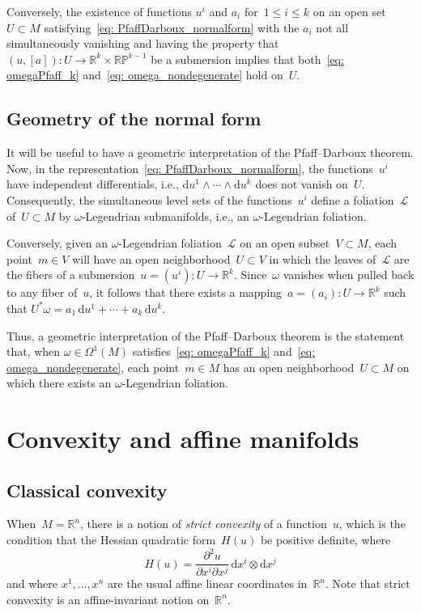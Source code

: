\documentclass[11pt]{article}
\numberwithin{equation}{section}
\renewcommand{\d}{\mathrm{d}}%
\newcommand{\cL}{{\mathcal L}}
\newcommand{\bbR}{{\mathbb R}}
\newcommand{\w}{\wedge}
\numberwithin{equation}{section}
\begin{document}
Conversely, the existence of functions $u^i$ and $a_i$ for~$1\le i\le k$
on an open set~$U\subset M$ satisfying~\eqref{eq: PfaffDarboux_normalform}
with the $a_i$ not all simultaneously vanishing and having the
property that $(u,[a]) \colon U\to\bbR^k\times\mathbb{RP}^{k-1}$
be a submersion implies that both~\eqref{eq: omegaPfaff_k}
and~\eqref{eq: omega_nondegenerate} hold on~$U$.

\subsection{Geometry of the normal form}
It will be useful to have a geometric interpretation
of the Pfaff--Darboux theorem.
Now, in the representation~\eqref{eq: PfaffDarboux_normalform},
the functions~$u^i$ have independent differentials,
i.e., $\d u^1\w\cdots\w\d u^k$ does not vanish on~$U$.
Consequently, the simultaneous level sets of the functions~$u^i$
define a foliation~$\cL$ of~$U\subset M$
by $\omega$-Legendrian submanifolds, i.e., an $\omega$-Legendrian foliation.

Conversely, given an $\omega$-Legendrian foliation~$\cL$
on an open subset~$V\subset M$, each point~$m\in V$ will
have an open neighborhood~$U\subset V$ in which the leaves of~$\cL$
are the fibers of a submersion~${u = (u^i) \colon U\to\bbR^k}$.
Since~$\omega$ vanishes when pulled back to any fiber of~$u$,
it follows that there exists a mapping~$a = (a_i) \colon U\to\bbR^k$
such that $U^*\omega = a_1\,\d u^1 + \cdots + a_k\,\d u^k$.

Thus, a geometric interpretation of the Pfaff--Darboux theorem
is the statement that,
when $\omega\in\Omega^1(M)$ satisfies~\eqref{eq: omegaPfaff_k}
and~\eqref{eq: omega_nondegenerate}, each point~$m\in M$
has an open neighborhood~$U\subset M$
on which there exists an $\omega$-Legendrian foliation.



\section{Convexity and affine manifolds}

\subsection{Classical convexity}
When~$M=\bbR^n$, there is a notion of \emph{strict convexity}
of a function~$u$, which is the condition
that the Hessian quadratic form~$H(u)$ be positive definite, where
\begin{equation}\label{eq: flat_Hessian}
H(u) = {\frac{\partial^2 u}{\partial x^i\partial x^j}}
\,\d x^i\otimes\d x^j
\end{equation}
and where $x^1,\ldots,x^n$
are the usual affine linear coordinates in~$\bbR^n$.
Note that strict convexity is an affine-invariant notion on~$\bbR^n$.
\end{document}
